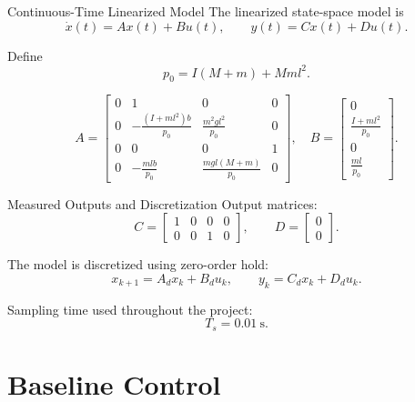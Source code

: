 \documentclass[aspectratio=169,11pt]{beamer}
\newcommand{\Ts}{T_s}
\begin{document}
\begin{frame}{Continuous-Time Linearized Model}
    The linearized state-space model is
    \[
    \dot{x}(t)=Ax(t)+Bu(t),\qquad y(t)=Cx(t)+Du(t).
    \]

    Define
    \[
    p_0 = I(M+m)+Mm l^2.
    \]

    \[
    A=
    \begin{bmatrix}
    0 & 1 & 0 & 0\\
    0 & -\frac{(I+ml^2)b}{p_0} & \frac{m^2gl^2}{p_0} & 0\\
    0 & 0 & 0 & 1\\
    0 & -\frac{mlb}{p_0} & \frac{mgl(M+m)}{p_0} & 0
    \end{bmatrix},
    \quad
    B=
    \begin{bmatrix}
    0\\
    \frac{I+ml^2}{p_0}\\
    0\\
    \frac{ml}{p_0}
    \end{bmatrix}.
    \]
\end{frame}

\begin{frame}{Measured Outputs and Discretization}
    Output matrices:
    \[
    C =
    \begin{bmatrix}
    1 & 0 & 0 & 0\\
    0 & 0 & 1 & 0
    \end{bmatrix},
    \qquad
    D =
    \begin{bmatrix}
    0\\0
    \end{bmatrix}.
    \]

    \vspace{0.4cm}
    The model is discretized using zero-order hold:
    \[
    x_{k+1}=A_d x_k+B_d u_k,\qquad y_k=C_d x_k+D_d u_k.
    \]

    \vspace{0.3cm}
    Sampling time used throughout the project:
    \[
    \Ts = 0.01~\mathrm{s}.
    \]
\end{frame}

\section{Baseline Control}
\end{document}
